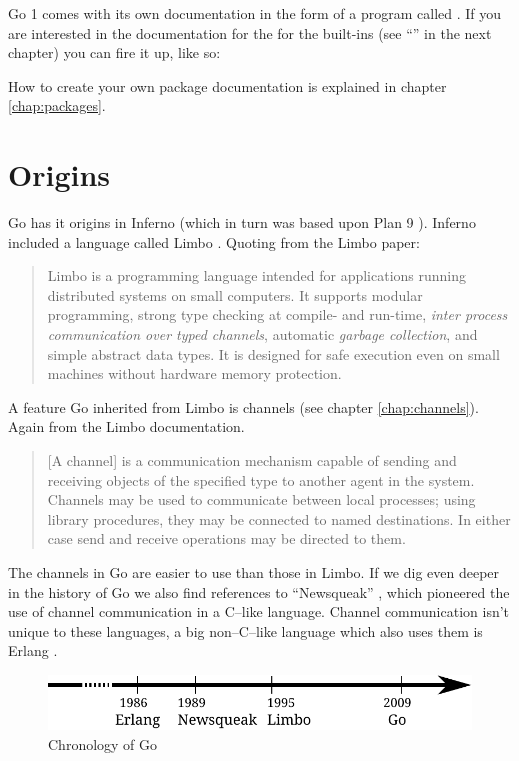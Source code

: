 Go 1 comes with its own documentation in the form of a program called 
. If you are interested in the documentation for the 
for the built-ins (see ``'' in the next chapter) you
can fire it up, like so:
\begin{display}
\pr {}
\end{display}

How to create your own package documentation is explained in chapter \ref{chap:packages}.

\section{Origins}
Go has it origins in Inferno \cite{inferno} (which in turn was based
upon Plan 9 \cite{plan9}). Inferno included a language called Limbo
\cite{limbo}. Quoting from the Limbo paper:
\begin{quote}
Limbo is a programming language intended for applications running
distributed systems on small computers. It supports modular programming,
strong type checking at compile- and run-time, \emph{inter process
communication over typed channels}, automatic \emph{garbage collection}, and
simple abstract data types. It is designed for safe execution even on
small machines without hardware memory protection.
\end{quote}
A feature Go inherited from Limbo is channels (see chapter
\ref{chap:channels}). Again from the Limbo documentation.
\begin{quote}
[A channel] is a communication mechanism capable of sending and receiving objects of
the specified type to another agent in the system. Channels may be used
to communicate between local processes; using library procedures, they
may be connected to named destinations. In either case send and receive
operations may be directed to them.
\end{quote}
The channels in Go are easier to use than those in Limbo.
If we dig even deeper in the history of Go we also find references
to ``Newsqueak'' \cite{newsqueak}, which pioneered the use of 
channel communication in a C--like language. Channel
communication isn't unique to these languages, a big non--C--like
language which also uses them is Erlang \cite{erlang}.

\begin{figure}[H]
\caption{Chronology of Go}
\label{fig:chrono-of-go}
\begin{center}
\includegraphics[scale=0.65]{fig/go-history.pdf}
\end{center}
\end{figure}

